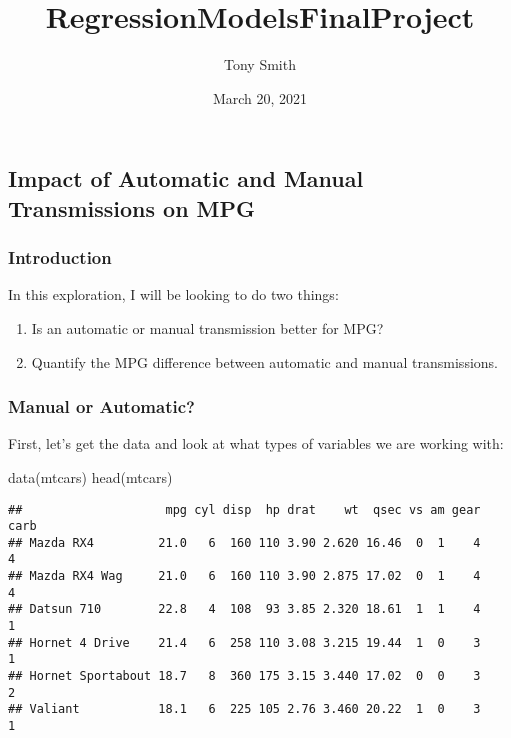 \documentclass[
]{article}
\title{RegressionModelsFinalProject}
\author{Tony Smith}
\date{March 20, 2021}
\newenvironment{Shaded}{\begin{snugshade}}{\end{snugshade}}
\newcommand{\FunctionTok}[1]{\textcolor[rgb]{0.00,0.00,0.00}{#1}}
\newcommand{\NormalTok}[1]{#1}
\providecommand{\tightlist}{%
  \setlength{\itemsep}{0pt}\setlength{\parskip}{0pt}}
\begin{document}
\maketitle

\hypertarget{impact-of-automatic-and-manual-transmissions-on-mpg}{%
\subsection{Impact of Automatic and Manual Transmissions on
MPG}\label{impact-of-automatic-and-manual-transmissions-on-mpg}}

\hypertarget{introduction}{%
\subsubsection{Introduction}\label{introduction}}

In this exploration, I will be looking to do two things:

\begin{enumerate}
\def\labelenumi{\arabic{enumi}.}
\tightlist
\item
  Is an automatic or manual transmission better for MPG?
\item
  Quantify the MPG difference between automatic and manual
  transmissions.
\end{enumerate}

\hypertarget{manual-or-automatic}{%
\subsubsection{Manual or Automatic?}\label{manual-or-automatic}}

First, let's get the data and look at what types of variables we are
working with:

\begin{Shaded}
\begin{Highlighting}[]
\FunctionTok{data}\NormalTok{(mtcars)}
\FunctionTok{head}\NormalTok{(mtcars)}
\end{Highlighting}
\end{Shaded}

\begin{verbatim}
##                    mpg cyl disp  hp drat    wt  qsec vs am gear carb
## Mazda RX4         21.0   6  160 110 3.90 2.620 16.46  0  1    4    4
## Mazda RX4 Wag     21.0   6  160 110 3.90 2.875 17.02  0  1    4    4
## Datsun 710        22.8   4  108  93 3.85 2.320 18.61  1  1    4    1
## Hornet 4 Drive    21.4   6  258 110 3.08 3.215 19.44  1  0    3    1
## Hornet Sportabout 18.7   8  360 175 3.15 3.440 17.02  0  0    3    2
## Valiant           18.1   6  225 105 2.76 3.460 20.22  1  0    3    1
\end{verbatim}
\end{document}

